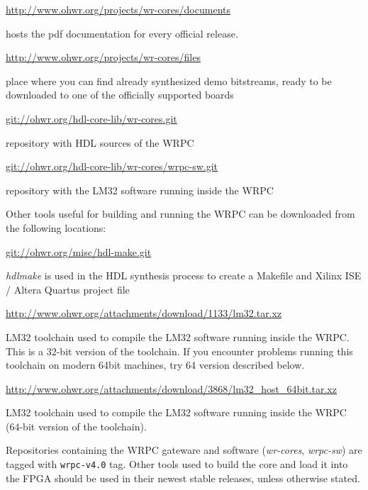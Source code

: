 \documentclass[a4paper, 12pt]{article}
\renewcommand{\_}{\underscore\allowbreak}
\begin{document}
\begin{itemize*}

\item \url{http://www.ohwr.org/projects/wr-cores/documents}

	hosts the pdf documentation for every official release.

\item \url{http://www.ohwr.org/projects/wr-cores/files}

	place where you can find already synthesized demo bitstreams, ready to be
  downloaded to one of the officially supported boards

\item \url{git://ohwr.org/hdl-core-lib/wr-cores.git}

	repository with HDL sources of the WRPC

\item \url{git://ohwr.org/hdl-core-lib/wr-cores/wrpc-sw.git}

  repository with the LM32 software running inside the WRPC

\end{itemize*}
Other tools useful for building and running the WRPC can be downloaded from the
following locations:

\begin{itemize*}

\item \url{git://ohwr.org/misc/hdl-make.git}

  \textit{hdlmake} is used in the HDL synthesis process to create a Makefile and
  Xilinx ISE / Altera Quartus project file

\item \url{http://www.ohwr.org/attachments/download/1133/lm32.tar.xz}

  LM32 toolchain used to compile the LM32 software running inside the WRPC.
  This is a 32-bit version of the toolchain. If you encounter problems running
  this toolchain on modern 64bit machines, try 64 version described below.

\item \url{http://www.ohwr.org/attachments/download/3868/lm32_host_64bit.tar.xz}

  LM32 toolchain used to compile the LM32 software running inside the WRPC
  (64-bit version of the toolchain).

  \end{itemize*}
Repositories containing the WRPC gateware and software (\textit{wr-cores},
\textit{wrpc-sw}) are tagged with \texttt{wrpc-v4.0} tag. Other tools used to
build the core and load it into the FPGA should be used in their newest stable
releases, unless otherwise stated.
\end{document}
